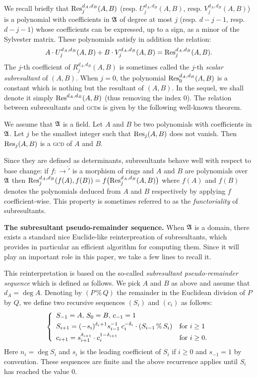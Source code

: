 \documentclass{sig-alternate}
\begin{document}
We recall briefly that $\text{\rm Res}_j^{d_A, d_B}(A,B)$ (resp. $U_j^{d_A, 
d_B}(A,B)$, resp. $V_j^{d_A, d_B}(A,B)$) is a polynomial with 
coefficients in $\mathfrak A$ of degree at most $j$ (resp. $d-j-1$, resp. 
$d-j-1$) whose coefficients can be expressed, up to a sign, as a minor 
of the Sylvester matrix. These polynomials satisfy in addition the
relation:
$$A \cdot U_j^{d_A,d_B}(A,B) + B \cdot V_j^{d_A,d_B}(A,B) = 
\text{\rm Res}^{d_A,d_B}_j(A,B).$$
The $j$-th coefficient of $R_j^{d_A,d_B}(A,B)$ is sometimes called the
$j$-th \emph{scalar subresultant} of $(A,B)$.
When $j=0$, the polynomial $\text{\rm Res}^{d_A,d_B}_0(A,B)$ is a constant which
is nothing but the resultant of $(A,B)$. In the sequel, we shall denote
it simply $\text{\rm Res}^{d_A,d_B}(A,B)$ (thus removing the index $0$).
The relation between subresultants and \textsc{gcd}s is given by the
following well-known theorem.

\begin{theo}
We assume that $\mathfrak A$ is a field. Let $A$ and $B$ be two polynomials
with coefficients in $\mathfrak A$. Let $j$ be the smallest integer such
that $\text{\rm Res}_j(A,B)$ does not vanish. Then $\text{\rm Res}_j(A,B)$ is a \textsc{gcd}
of $A$ and $B$.
\end{theo}

Since they are defined as determinants, subresultants behave well with 
respect to base change: if $f : \ring \to \ring'$ is a morphism of rings 
and $A$ and $B$ are polynomials over $\mathfrak A$ then
$\text{\rm Res}_j^{d_A,d_B}(f(A),f(B)) = f\big(\text{\rm Res}_j^{d_A,d_B}(A,B)\big)$
where $f(A)$ and $f(B)$ denotes the polynomials deduced from $A$
and $B$ respectively by applying $f$ coefficient-wise. This property
is sometimes referred to as the \emph{functoriality} of subresultants.

\medskip

\noindent
\textbf{The subresultant pseudo-remainder sequence.}
When $\mathfrak A$ is a domain, there exists a standard nice Euclide-like
reinterpreation of subresultants, which provides in particular an 
efficient algorithm for computing them. Since it will play an important 
role in this paper, we take a few lines to recall it.

This reinterpretation is based on the so-called \emph{subresultant 
pseudo-remainder sequence} which is defined as follows. We pick $A$ and 
$B$ as above and assume that $d_A = \deg A$. Denoting by $(P \,\%\, Q)$ 
the remainder in the Euclidean division of $P$ by $Q$, we define two 
recursive sequences $(S_i)$ and $(c_i)$ as follows:
$$\left\{\begin{array}{ll}
S_{-1} = A, \, S_0 = B, \, c_{-1} = 1 \smallskip \\
\displaystyle S_{i+1} = (-s_i)^{\delta_i + 1}
s_{i-1}^{-1} \: c_i^{-\delta_i} \cdot (S_{i-1} \,\%\, S_i)
& \text{for } i \geq 1 \smallskip \\
\displaystyle c_{i+1} = s_{i+1}^{\delta_{i+1}} \cdot c_i^{1-\delta_{i+1}}
& \text{for } i \geq 0. 
\end{array}\right.$$
Here $n_i = \deg S_i$ and $s_i$ is the leading coefficient of 
$S_i$ if $i \geq 0$ and $s_{-1} = 1$ by convention. These sequences 
are finite and the above recurrence applies until $S_i$ has reached 
the value $0$.
\end{document}
